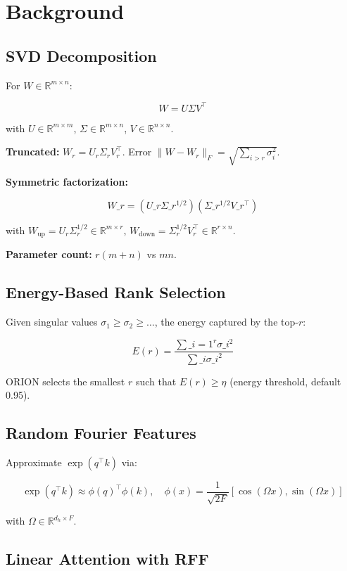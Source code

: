 
\section{Background}

\subsection{SVD Decomposition}

For $W \in \mathbb{R}^{m \times n}$:

\[
W = U \Sigma V^\top
\tag{3.1}
\]

with $U \in \mathbb{R}^{m \times m}$, $\Sigma \in \mathbb{R}^{m \times n}$, 
$V \in \mathbb{R}^{n \times n}$.

\textbf{Truncated:} $W_r = U_r \Sigma_r V_r^\top$. Error $\|W - W_r\|_F = \sqrt{\sum_{i > r} \sigma_i^2}$.

\textbf{Symmetric factorization:}

\[
W\_r = (U\_r \Sigma\_r^{1/2})(\Sigma\_r^{1/2} V\_r^\top)
\tag{3.2}
\]

with $W_\text{up} = U_r \Sigma_r^{1/2} \in \mathbb{R}^{m \times r}$, 
$W_\text{down} = \Sigma_r^{1/2} V_r^\top \in \mathbb{R}^{r \times n}$.

\textbf{Parameter count:} $r(m + n)$ vs $mn$.

\subsection{Energy-Based Rank Selection}

Given singular values $\sigma_1 \geq \sigma_2 \geq \dots$, the energy 
captured by the top-$r$:

\[
E(r) = \frac{\sum\_{i=1}^{r} \sigma\_i^2}{\sum\_i \sigma\_i^2}
\tag{3.3}
\]

ORION selects the smallest $r$ such that $E(r) \geq \eta$ (energy threshold, 
default 0.95).

\subsection{Random Fourier Features}

Approximate $\exp(q^\top k)$ via:

\[
\exp(q^\top k) \approx \phi(q)^\top \phi(k), \quad
\phi(x) = \frac{1}{\sqrt{2F}} [\cos(\Omega x), \sin(\Omega x)]
\tag{3.4}
\]

with $\Omega \in \mathbb{R}^{d_h \times F}$.

\subsection{Linear Attention with RFF}

